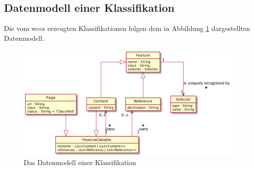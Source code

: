 
    \subsection{Datenmodell einer Klassifikation}
        \label{section:conceptPageDataModel}
        Die vom \gls{wccs} erzeugten Klassifikationen folgen dem
        in Abbildung \ref{image:conceptPageDataModel} dargestellten Datenmodell.

        \begin{figure}[htb]
            \centering
            \includegraphics[scale=\imageScalingFactor]{../resources/concept/page.png}
            \caption{Das Datenmodell einer Klassifikation}
            \label{image:conceptPageDataModel}
        \end{figure}

